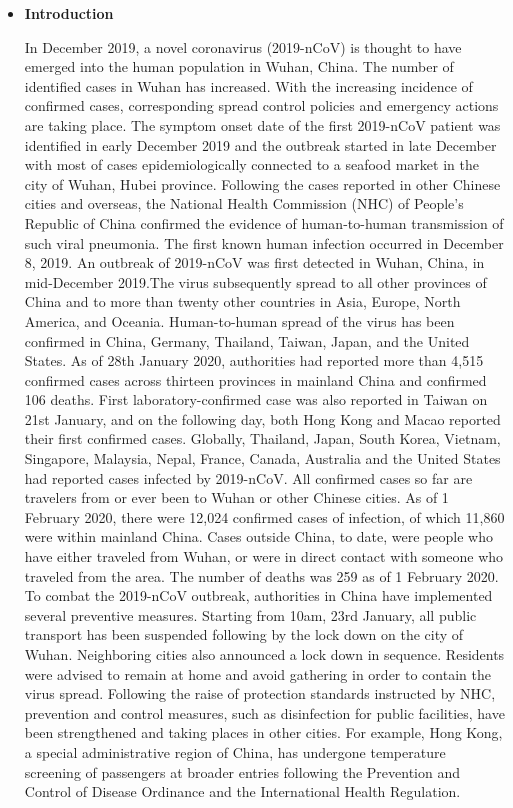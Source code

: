 \documentclass{exam}
\begin{document}
\begin{itemize}
	\item \textbf{Introduction}
	

In December 2019, a novel coronavirus (2019-nCoV) is thought to have emerged into the human population in Wuhan, China. The number of identified cases in Wuhan has increased. With the increasing incidence of confirmed cases, corresponding spread control policies and emergency actions are taking place. The symptom onset date of the first 2019-nCoV patient was identified in early December 2019 and the outbreak started in late December with most of cases epidemiologically connected to a seafood market in the city of Wuhan, Hubei province. Following the cases reported in other Chinese cities and overseas, the National Health Commission (NHC) of People’s Republic of China confirmed the evidence of human-to-human transmission of such viral pneumonia. 
The first known human infection occurred in December 8, 2019. An outbreak of 2019-nCoV was first detected in Wuhan, China, in mid-December 2019.The virus subsequently spread to all other provinces of China and to more than twenty other countries in Asia, Europe, North America, and Oceania. Human-to-human spread of the virus has been confirmed in China, Germany, Thailand, Taiwan, Japan, and the United States.
As of 28th January 2020, authorities had reported more than 4,515 confirmed cases across thirteen provinces in mainland China and confirmed 106 deaths. First laboratory-confirmed case was also reported in Taiwan on 21st January, and on the following day, both Hong Kong and Macao reported their first confirmed cases. Globally, Thailand, Japan, South Korea, Vietnam, Singapore, Malaysia, Nepal, France, Canada, Australia and the United States had reported cases infected by 2019-nCoV. All confirmed cases so far are travelers from or ever been to Wuhan or other Chinese cities. 
As of 1 February 2020, there were 12,024 confirmed cases of infection, of which 11,860 were within mainland China. Cases outside China, to date, were people who have either traveled from Wuhan, or were in direct contact with someone who traveled from the area. The number of deaths was 259 as of 1 February 2020.
To combat the 2019-nCoV outbreak, authorities in China have implemented several preventive measures. Starting from 10am, 23rd January, all public transport has been suspended following by the lock down on the city of Wuhan. Neighboring cities also announced a lock down in sequence. Residents were advised to remain at home and avoid gathering in order to contain the virus spread. Following the raise of protection standards instructed by NHC, prevention and control measures, such as disinfection for public facilities, have been strengthened and taking places in other cities. For example, Hong Kong, a special administrative region of China, has undergone temperature screening of passengers at broader entries following the Prevention and Control of Disease Ordinance and the International Health Regulation.


\end{itemize}
\end{document}
